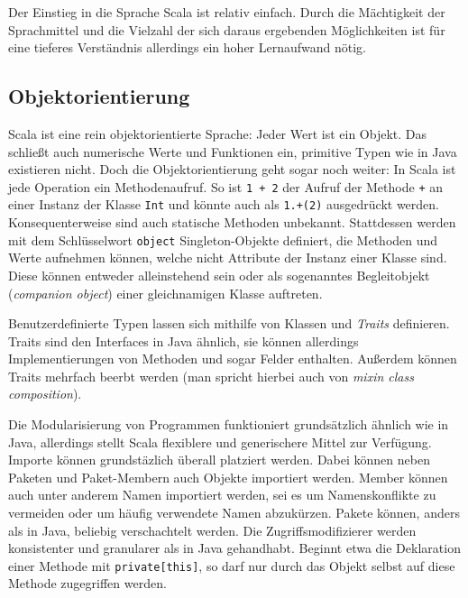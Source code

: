 \documentclass[a4paper, 12pt, listof=totoc, bibliography=totoc]{scrreprt}
\begin{document}
Der Einstieg in die Sprache Scala ist relativ einfach. Durch die Mächtigkeit der Sprachmittel und die Vielzahl der sich daraus ergebenden Möglichkeiten ist für eine tieferes Verständnis allerdings ein hoher Lernaufwand nötig.



\subsection{Objektorientierung}

Scala ist eine rein objektorientierte Sprache: Jeder Wert ist ein Objekt. Das schließt auch numerische Werte und Funktionen ein, primitive Typen wie in Java existieren nicht. Doch die Objektorientierung geht sogar noch weiter: In Scala ist jede Operation ein Methodenaufruf. So ist \texttt{1 + 2} der Aufruf der Methode \texttt{+} an einer Instanz der Klasse \texttt{Int} und könnte auch als \texttt{1.+(2)} ausgedrückt werden. Konsequenterweise sind auch statische Methoden unbekannt. Stattdessen werden mit dem Schlüsselwort \texttt{object} Singleton-Objekte definiert, die Methoden und Werte aufnehmen können, welche nicht Attribute der Instanz einer Klasse sind. Diese können entweder alleinstehend sein oder als sogenanntes Begleitobjekt (\textit{companion object}) einer gleichnamigen Klasse auftreten.

Benutzerdefinierte Typen lassen sich mithilfe von Klassen und \textit{Traits} definieren. Traits sind den Interfaces in Java ähnlich, sie können allerdings Implementierungen von Methoden und sogar Felder enthalten. Außerdem können Traits mehrfach beerbt werden (man spricht hierbei auch von \textit{mixin class composition}).

Die Modularisierung von Programmen funktioniert grundsätzlich ähnlich wie in Java, allerdings stellt Scala flexiblere und generischere Mittel zur Verfügung. Importe können grundstäzlich überall platziert werden. Dabei können neben Paketen und Paket-Membern auch Objekte importiert werden. Member können auch unter anderem Namen importiert werden, sei es um Namenskonflikte zu vermeiden oder um häufig verwendete Namen abzukürzen.
Pakete können, anders als in Java, beliebig verschachtelt werden. Die Zugriffsmodifizierer werden konsistenter und granularer als in Java gehandhabt. Beginnt etwa die Deklaration einer Methode mit \texttt{private[this]}, so darf nur durch das Objekt selbst auf diese Methode zugegriffen werden.\cite[S. 9 f., S. 233 ff.]{odersky2008.PIS}\cite{scala-lang.ATS}
\end{document}
